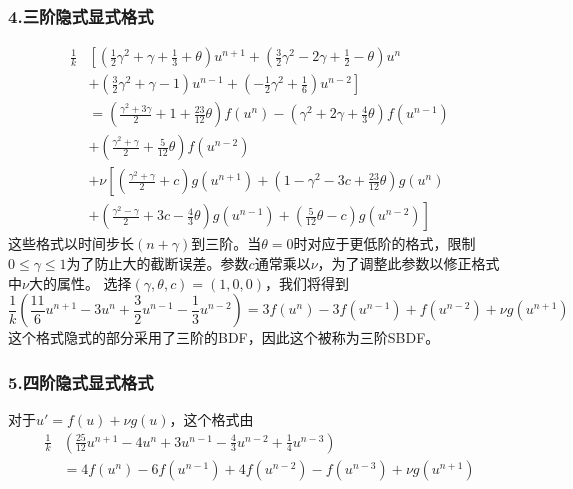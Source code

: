 \documentclass[12pt,a4paper]{article}
\begin{document}
\subsubsection{4.三阶隐式显式格式}
\begin{equation}
\begin{aligned}
\frac{1}{k}&\left[\left(\frac{1}{2}\gamma^2+\gamma+\frac{1}{3}+\theta\right)u^{n+1}+\left(\frac{3}{2}\gamma^2-2\gamma+\frac{1}{2}-\theta\right)u^n\right.\\
&\left.+\left(\frac{3}{2}\gamma^2+\gamma-1\right)u^{n-1}+\left(-\frac{1}{2}\gamma^2+\frac{1}{6}\right)u^{n-2}\right]\\
&=\left(\frac{\gamma^2+3\gamma}{2}+1+\frac{23}{12}\theta\right)f(u^n)-\left(\gamma^2+2\gamma+\frac{4}{3}\theta\right)f(u^{n-1})\\
&+\left(\frac{\gamma^2+\gamma}{2}+\frac{5}{12}\theta\right)f(u^{n-2})\\
&+\nu\left[\left(\frac{\gamma^2+\gamma}{2}+c\right)g(u^{n+1})+\left(1-\gamma^2-3c+\frac{23}{12}\theta\right)g(u^n)\right.\\
&\left.+\left(\frac{\gamma^2-\gamma}{2}+3c-\frac{4}{3}\theta\right)g(u^{n-1})+\left(\frac{5}{12}\theta-c\right)g(u^{n-2})\right]
\end{aligned}
\end{equation}
这些格式以时间步长$(n+\gamma)$到三阶。当$\theta=0$时对应于更低阶的格式，限制$0\le\gamma\le 1$为了防止大的截断误差。参数$c$通常乘以$\nu$，为了调整此参数以修正格式中$\nu$大的属性。
选择$(\gamma,\theta,c)=(1,0,0)$，我们将得到
\begin{equation}
\frac{1}{k}\left(\frac{11}{6}u^{n+1}-3u^n+\frac{3}{2}u^{n-1}-\frac{1}{3}u^{n-2}\right)=3f(u^n)-3f(u^{n-1})+f(u^{n-2})+\nu g(u^{n+1})
\end{equation}
这个格式隐式的部分采用了三阶的BDF，因此这个被称为三阶SBDF。
\subsubsection{5.四阶隐式显式格式}
对于$u'=f(u)+\nu g(u)$，这个格式由
\begin{equation}
\begin{aligned}
\frac{1}{k}&\left(\frac{25}{12}u^{n+1}-4u^n+3u^{n-1}-\frac{4}{3}u^{n-2}+\frac{1}{4}u^{n-3}\right)\\
&=4f(u^n)-6f(u^{n-1})+4f(u^{n-2})-f(u^{n-3})+\nu g(u^{n+1})
\end{aligned}
\end{equation}



\cite{tam19912d}

\end{document}
